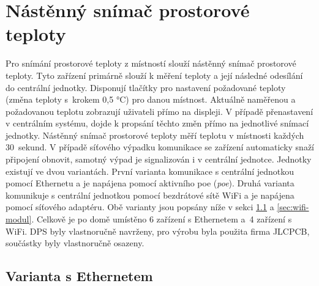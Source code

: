 \section{Nástěnný snímač prostorové teploty}

Pro snímání prostorové teploty z místností slouží nástěnný snímač prostorové teploty. Tyto zařízení primárně slouží k měření teploty a její následné odesílání do centrální jednotky. Disponují tlačítky pro nastavení požadované teploty (změna teploty s~krokem 0,5 °C) pro danou místnost. Aktuálně naměřenou a požadovanou teplotu zobrazují uživateli přímo na displeji. V případě přenastavení v centrálním systému, dojde k propsání těchto změn přímo na jednotlivé snímací jednotky.  Nástěnný snímač prostorové teploty měří teplotu v místnosti každých 30~sekund. V případě síťového výpadku komunikace se zařízení automaticky snaží připojení obnovit, samotný výpad je signalizován i v centrální jednotce. Jednotky existují ve dvou variantách. První varianta komunikace s centrální jednotkou pomocí Ethernetu a je napájena pomocí aktivního \acrshort{poe} (\textit{\acrlong{poe}}). Druhá varianta komunikuje s centrální jednotkou pomocí bezdrátové sítě WiFi a je napájena pomocí síťového adaptéru. Obě varianty jsou popsány níže v sekci \ref{sec:ethernet-modul} a \ref{sec:wifi-modul}. Celkově je po domě umístěno 6 zařízení s Ethernetem a~4 zařízení s WiFi. DPS byly vlastnoručně navrženy, pro výrobu byla použita firma JLCPCB, součástky byly vlastnoručně osazeny.

\subsection{Varianta s Ethernetem}
\label{sec:ethernet-modul}

